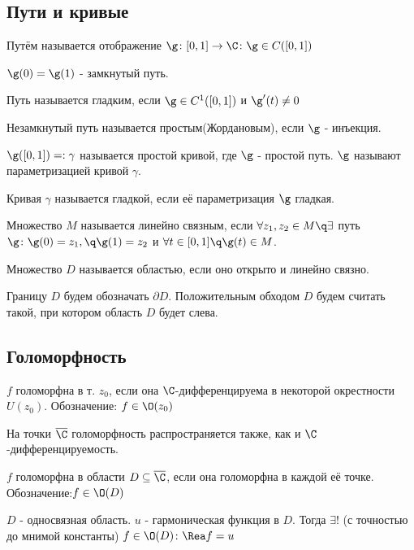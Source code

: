 \subsection{Пути и кривые}
\begin{definition}
  Путём называется отображение $\g \colon [0,1]\to\C\colon \g\in C([0,1])$
\end{definition}
\begin{definition}
  $\g(0)=\g(1)$ - замкнутый путь. 
\end{definition}
\begin{definition}
  Путь называется гладким, если $\g\in C^1([0,1])$ и $\g'(t)\neq 0$ 
\end{definition}
\begin{definition}
  Незамкнутый путь называется простым(Жордановым), если $\g$ - инъекция. 
\end{definition}
\begin{definition}
  $\g([0,1])=:\gamma$ называется простой кривой, где $\g$ - простой путь. $\g$ называют параметризацией кривой $\gamma$. 
\end{definition}
\begin{definition}
  Кривая $\gamma$ называется гладкой, если её параметризация $\g$ гладкая. 
\end{definition}
\begin{definition}
  Множество $M$ называется линейно связным, если $\forall z_1,z_2\in M\q\exists$ путь $\g\colon\g(0)=z_1,\q\g(1)=z_2$ и $\forall t\in[0,1]\q \g(t)\in M$.
\end{definition}
\begin{definition}
  Множество $D$ называется областью, если оно открыто и линейно связно. 
\end{definition}
  Границу $D$ будем обозначать $\partial D$. Положительным обходом $D$ будем считать такой, при котором область $D$ будет слева.
\subsection{Голоморфность}
\begin{definition}
  $f$ голоморфна в т. $z_0$, если она $\C$-дифференцируема в некоторой окрестности $U(z_0)$. Обозначение: $f\in\O(z_0)$
\end{definition}
На точки $\overline{\C}$ голоморфность распространяется также, как и $\C$-дифференцируемость. 
\begin{definition}
  $f$ голоморфна в области $D\subseteq \overline{\C}$, если она голоморфна в каждой её точке. Обозначение:$f\in\O(D)$
\end{definition}
\begin{theorem}
  $D$ - односвязная область. $u$ - гармоническая функция в $D$. Тогда $\exists!$ (с точностью до мнимой константы) $f\in \O(D)\colon \Rea f=u$ 
\end{theorem}

